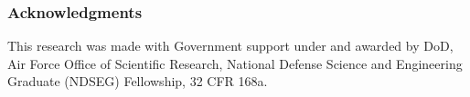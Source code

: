 \documentclass{article} %
\begin{document}
\subsubsection*{Acknowledgments}
This research was made with Government support under and awarded by DoD, Air Force Office of Scientific Research, National Defense Science and Engineering Graduate (NDSEG) Fellowship, 32 CFR 168a.

\renewcommand\bibsection{\subsubsection*{\refname}}

\small{
  
}
\end{document}
